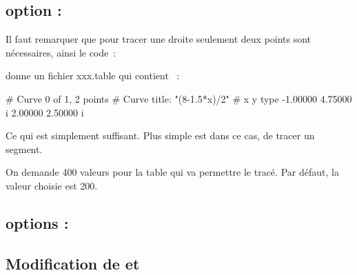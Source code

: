 \subsection{option : }

Il faut remarquer que pour tracer une droite seulement deux points sont nécessaires, ainsi le code~:

\begin{tkzltxexample}[]
\end{tkzltxexample}


donne un fichier xxx.table qui contient ~:

\begin{tkzltxexample}[]
# Curve 0 of 1, 2 points
# Curve title: "(8-1.5*x)/2"
# x y type
-1.00000 4.75000  i
2.00000 2.50000  i
\end{tkzltxexample}

Ce qui est simplement suffisant. Plus simple est dans ce cas, de tracer un segment.

On demande 400 valeurs pour la table qui va permettre le tracé. Par défaut, la valeur choisie est 200.

\medskip
\begin{tkzexample}[latex=7cm]
\end{tkzexample}

\subsection{options : }


\begin{tkzexample}[]
\end{tkzexample}


\subsection{Modification de  et }

